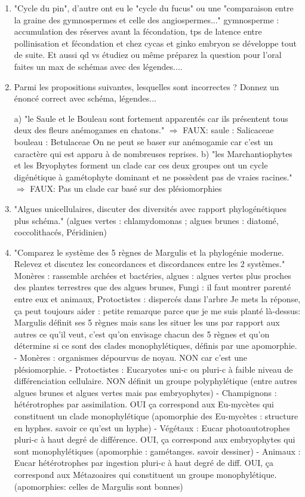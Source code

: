\begin{enumerate}
	\item "Cycle du pin", d'autre ont eu le "cycle du fucus" ou une "comparaison entre la graine des gymnospermes et celle des angiospermes..." gymnosperme : accumulation des réserves avant la fécondation, tps de latence entre pollinisation et fécondation et chez cycas et ginko embryon se développe tout de suite.
 Et aussi qd vs étudiez ou même préparez la question pour l'oral faites un max de schémas avec des légendes....
 
 
	\item Parmi les propositions suivantes, lesquelles sont incorrectes ? Donnez un énoncé correct avec schéma, légendes... 

a) "le Saule et le Bouleau sont fortement apparentés car ils présentent tous deux des fleurs anémogames en chatons."
$\Rightarrow$ FAUX: saule : Salicaceae bouleau : Betulaceae On ne peut se baser sur anémogamie car c’est un caractère qui est apparu à de nombreuses reprises.
 b) "les Marchantiophytes et les Bryophytes forment un clade car ces deux groupes ont un cycle digénétique à gamétophyte dominant et ne possèdent pas de vraies racines."
$\Rightarrow$ FAUX: Pas un clade car basé sur des plésiomorphies

	\item "Algues unicellulaires, discuter des diversités avec rapport phylogénétiques plus schéma." (algues vertes : chlamydomonas ; algues brunes : diatomé, coccolithacés, Péridinien)

	\item "Comparez le système des 5 règnes de Margulis et la phylogénie moderne. Relevez et discutez les concordances et discordances entre les 2 systèmes."
 Monères : rassemble archées et bactéries, algues : algues vertes plus proches des plantes terrestres que des algues brunes, Fungi : il faut montrer parenté entre eux et animaux, Protoctistes : dispercés dans l’arbre
Je mets la réponse, ça peut toujours aider : petite remarque parce que je me suis planté là-dessus: Margulis définit ses 5 règnes mais sans les situer les uns par rapport aux autres ce qu'il veut, c'est qu'on envisage chacun des 5 règnes et qu'on détermine si ce sont des clades monophylétiques, définis par une apomorphie.
- Monères : organismes dépourvus de noyau. NON car c'est une plésiomorphie. 
- Protoctistes : Eucaryotes uni-c ou pluri-c à faible niveau de différenciation cellulaire. NON définit un groupe polyphylétique (entre autres algues brunes et algues vertes mais pas embryophytes)
- Champignons : hétérotrophes par assimilation. OUI ça correspond aux Eu-mycètes qui constituent un clade monophylétique (apomorphie des Eu-mycètes : structure en hyphes. savoir ce qu'est un hyphe)
- Végétaux : Eucar photoautotrophes pluri-c à haut degré de différence. OUI, ça correspond aux embryophytes qui sont monophylétiques (apomorphie : gamétanges. savoir dessiner)
- Animaux : Eucar hétérotrophes par ingestion pluri-c à haut degré de diff. OUI, ça correspond aux Métazoaires qui constituent un groupe monophylétique. (apomorphies: celles de Margulis sont bonnes)


\end{enumerate}
